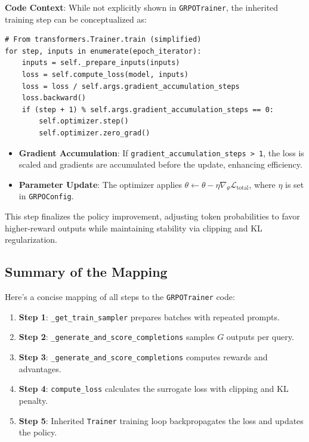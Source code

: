 \documentclass{article}
\begin{document}
\textbf{Code Context}: While not explicitly shown in \texttt{GRPOTrainer}, the inherited training step can be conceptualized as:

\begin{verbatim}
# From transformers.Trainer.train (simplified)
for step, inputs in enumerate(epoch_iterator):
    inputs = self._prepare_inputs(inputs)
    loss = self.compute_loss(model, inputs)
    loss = loss / self.args.gradient_accumulation_steps
    loss.backward()
    if (step + 1) % self.args.gradient_accumulation_steps == 0:
        self.optimizer.step()
        self.optimizer.zero_grad()
\end{verbatim}

\begin{itemize}
    \item \textbf{Gradient Accumulation}: If \texttt{gradient\_accumulation\_steps > 1}, the loss is scaled and gradients are accumulated before the update, enhancing efficiency.
    
    \item \textbf{Parameter Update}: The optimizer applies \( \theta \leftarrow \theta - \eta \nabla_\theta \mathcal{L}_{\text{total}} \), where \( \eta \) is set in \texttt{GRPOConfig}.
\end{itemize}

This step finalizes the policy improvement, adjusting token probabilities to favor higher-reward outputs while maintaining stability via clipping and KL regularization.

\subsection*{Summary of the Mapping}

Here’s a concise mapping of all steps to the \texttt{GRPOTrainer} code:
\begin{enumerate}
    \item \textbf{Step 1}: \texttt{\_get\_train\_sampler} prepares batches with repeated prompts.
    \item \textbf{Step 2}: \texttt{\_generate\_and\_score\_completions} samples \( G \) outputs per query.
    \item \textbf{Step 3}: \texttt{\_generate\_and\_score\_completions} computes rewards and advantages.
    \item \textbf{Step 4}: \texttt{compute\_loss} calculates the surrogate loss with clipping and KL penalty.
    \item \textbf{Step 5}: Inherited \texttt{Trainer} training loop backpropagates the loss and updates the policy.
\end{enumerate}
\end{document}
